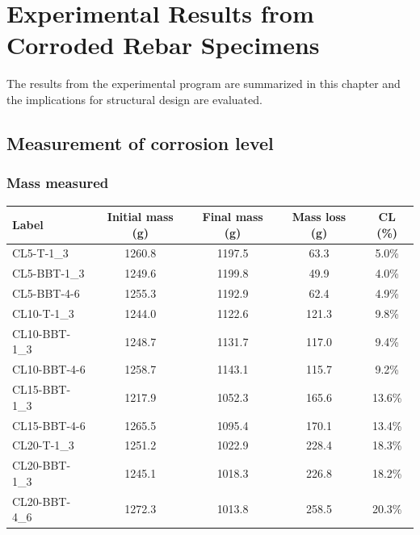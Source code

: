 \chapter{Experimental Results from Corroded Rebar Specimens}
The results from the experimental program are summarized in this chapter and the implications for structural design are evaluated.

\section{Measurement of corrosion level}

\subsection{Mass measured}

\begin{table}[]
\begin{center}
\begin{tabular}{lcccc}
Label         & Initial mass (g) & Final mass (g) & Mass loss (g) & CL (\%) \\ \hline
CL5-T-1\_3    & 1260.8           & 1197.5         & 63.3          & 5.0\%   \\
CL5-BBT-1\_3  & 1249.6           & 1199.8         & 49.9          & 4.0\%   \\
CL5-BBT-4-6   & 1255.3           & 1192.9         & 62.4          & 4.9\%   \\
CL10-T-1\_3   & 1244.0           & 1122.6         & 121.3         & 9.8\%   \\
CL10-BBT-1\_3 & 1248.7           & 1131.7         & 117.0         & 9.4\%   \\
CL10-BBT-4-6  & 1258.7           & 1143.1         & 115.7         & 9.2\%   \\
CL15-BBT-1\_3 & 1217.9           & 1052.3         & 165.6         & 13.6\%  \\
CL15-BBT-4-6  & 1265.5           & 1095.4         & 170.1         & 13.4\%  \\
CL20-T-1\_3   & 1251.2           & 1022.9         & 228.4         & 18.3\%  \\
CL20-BBT-1\_3 & 1245.1           & 1018.3         & 226.8         & 18.2\%  \\
CL20-BBT-4\_6  & 1272.3           & 1013.8         & 258.5         & 20.3\% 
\end{tabular}
\end{center}
\end{table}


